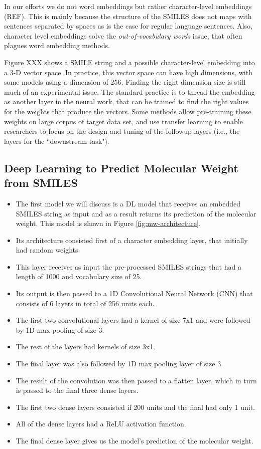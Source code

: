 In our efforts we do not word embeddings but rather character-level embeddings (REF). This is mainly because the structure of the SMILES does not maps with sentences separated by spaces as is the case for regular language sentences. Also, character level embeddings solve the {\em out-of-vocabulary words} issue, that often plagues word embedding methods.


Figure XXX shows a SMILE string and a possible character-level embedding into a 3-D vector space. In practice, this vector space can have high dimensions, with some models using a dimension of 256. Finding the right dimension size is still much of an experimental issue. 
The standard practice is to thread the embedding as  another layer in the neural work, that can be trained to find the right values for the weights that produce the vectors. Some methods allow pre-training these weights on large corpus of target data set, and use transfer learning to enable researchers to focus on the design and tuning of the followup layers (i.e., the layers for the ``downstream task").

    \subsection{Deep Learning to Predict Molecular Weight from SMILES}
        \begin{itemize}
            \item The first model we will discuss is a DL model that receives an embedded SMILES string as input and as a result returns its prediction of the molecular weight. This model is shown in Figure \ref{fig:mw-architecture}.
            \item Its architecture consisted first of a character embedding layer, that initially had random weights.
            \item This layer receives as input the pre-processed SMILES strings that had a length of 1000 and vocabulary size of 25.
            \item Its output is then passed to a 1D Convolutional Neural Network (CNN) that consists of 6 layers in total of 256 units each.
            \item The first two convolutional layers had a kernel of size 7x1 and were followed by 1D max pooling of size 3.
            \item The rest of the layers had kernels of size 3x1.
            \item The final layer was also followed by 1D max pooling layer of size 3.
            \item The result of the convolution was then passed to a flatten layer, which in turn is passed to the final three dense layers. 
            \item The first two dense layers consisted if 200 units and the final had only 1 unit. 
            \item All of the dense layers had a ReLU activation function.
            \item The final dense layer gives us the model's prediction of the molecular weight.
        \end{itemize}
